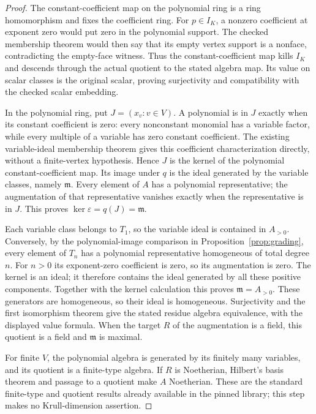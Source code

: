 \begin{proof}
\leanok
The constant-coefficient map on the polynomial ring is a ring homomorphism
and fixes the coefficient ring. For $p\in I_K$, a nonzero coefficient at
exponent zero would put zero in the polynomial support. The checked
membership theorem would then say that its empty vertex support is a
nonface, contradicting the empty-face witness. Thus the constant-coefficient
map kills $I_K$ and descends through the actual quotient to the stated
algebra map. Its value on scalar classes is the original scalar, proving
surjectivity and compatibility with the checked scalar embedding.

In the polynomial ring, put $J=(x_v:v\in V)$. A polynomial is in $J$
exactly when its constant coefficient is zero: every nonconstant monomial
has a variable factor, while every multiple of a variable has zero constant
coefficient. The existing variable-ideal membership theorem gives this
coefficient characterization directly, without a finite-vertex hypothesis.
Hence $J$ is the kernel of the polynomial constant-coefficient map.
Its image under $q$ is the ideal generated by the variable classes, namely
$\mathfrak m$. Every element of $A$ has a polynomial representative; the
augmentation of that representative vanishes exactly when the representative
is in $J$. This proves $\ker\varepsilon=q(J)=\mathfrak m$.

Each variable class belongs to $T_1$, so the variable ideal is contained
in $A_{>0}$. Conversely, by the polynomial-image comparison in
Proposition~\ref{prop:grading}, every element of $T_n$ has a polynomial
representative homogeneous of total degree $n$. For $n>0$ its exponent-zero
coefficient is zero, so its augmentation is zero. The kernel is an ideal;
it therefore contains the ideal generated by all these positive components.
Together with the kernel calculation this proves
$\mathfrak m=A_{>0}$. These generators are homogeneous, so their ideal is
homogeneous. Surjectivity and the first isomorphism theorem give the stated
residue algebra equivalence, with the displayed value formula. When the
target $R$ of the augmentation is a field, this quotient is a field and
$\mathfrak m$ is maximal.

For finite $V$, the polynomial algebra is generated by its finitely many
variables, and its quotient is a finite-type algebra. If $R$ is Noetherian,
Hilbert's basis theorem and passage to a quotient make $A$ Noetherian.
These are the standard finite-type and quotient results already available
in the pinned library; this step makes no Krull-dimension assertion.


\end{proof}

